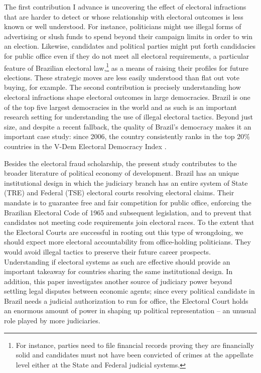 \documentclass[11pt]{article}
\begin{document}
The first contribution I advance is uncovering the effect of electoral infractions that are harder to detect or whose relationship with electoral outcomes is less known or well understood. For instance, politicians might use illegal forms of advertising or slush funds to spend beyond their campaign limits in order to win an election. Likewise, candidates and political parties might put forth candidacies for public office even if they do not meet all electoral requirements, a particular feature of Brazilian electoral law,\footnote{For instance, parties need to file financial records proving they are financially solid and candidates must not have been convicted of crimes at the appellate level either at the State and Federal judicial systems.} as a means of raising their profiles for future elections. These strategic moves are less easily understood than flat out vote buying, for example. The second contribution is precisely understanding how electoral infractions shape electoral outcomes in large democracies. Brazil is one of the top five largest democracies in the world and as such is an important research setting for understanding the use of illegal electoral tactics. Beyond just size, and despite a recent fallback, the quality of Brazil's democracy makes it an important case study: since 2006, the country consistently ranks in the top 20\% countries in the V-Dem Electoral Democracy Index \citep{CoppedgeVDemCountryYearDataset2018}.

Besides the electoral fraud scholarship, the present study contributes to the broader literature of political economy of development. Brazil has an unique institutional design in which the judiciary branch has an entire system of State (TRE) and Federal (TSE) electoral courts resolving electoral claims. Their mandate is to guarantee free and fair competition for public office, enforcing the Brazilian Electoral Code of 1965 and subsequent legislation, and to prevent that candidates not meeting code requirements join electoral races. To the extent that the Electoral Courts are successful in rooting out this type of wrongdoing, we should expect more electoral accountability from office-holding politicians. They would avoid illegal tactics to preserve their future career prospects. Understanding if electoral systems as such are effective should provide an important takeaway for countries sharing the same institutional design. In addition, this paper investigates another source of judiciary power beyond settling legal disputes between economic agents; since every political candidate in Brazil needs a judicial authorization to run for office, the Electoral Court holds an enormous amount of power in shaping up political representation -- an unusual role played by more judiciaries.
\end{document}
